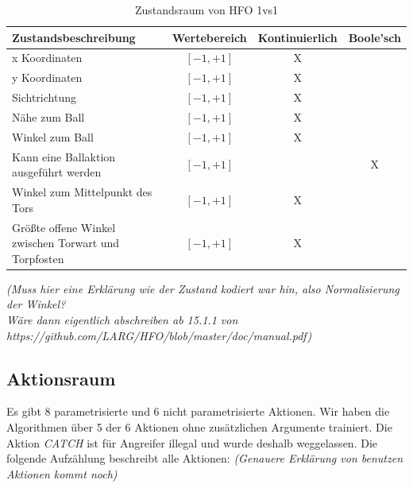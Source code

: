             \begin{table}[H]
                \begin{center}
                \hspace*{-1.5cm}
                \begin{tabular}{ |l|c|c|c| } 
                    \hline
                    \hfill Zustandsbeschreibung & Wertebereich & Kontinuierlich & Boole'sch \\ \hline
                    x Koordinaten & $[ -1, +1 ]$ & X & \hfill \\ \hline
                    y Koordinaten & $[ -1, +1 ]$ & X & \hfill \\ \hline
                    Sichtrichtung & $[ -1, +1]$ & X & \hfill \\ \hline
                    Nähe zum Ball & $[ -1, +1 ]$ & X & \hfill \\ \hline
                    Winkel zum Ball & $[ -1, +1 ]$ & X & \hfill \\ \hline
                    Kann eine Ballaktion ausgeführt werden & $[ -1, +1 ]$ & \hfill & X \\ \hline
                    Winkel zum Mittelpunkt des Tors & $[ -1, +1 ]$ & X & \hfill \\ \hline
                    Größte offene Winkel zwischen Torwart und Torpfosten & $[ -1, +1 ]$ & X & \hfill \\ \hline
                \end{tabular}
                \end{center}
                \caption{Zustandsraum von HFO 1vs1 \label{fig:somelabel}}
            \end{table}

            \hspace*{-1.5cm}
            \textit{(Muss hier eine Erklärung wie der Zustand kodiert war hin, also Normalisierung der Winkel?\\
            \hspace*{-1.5cm} Wäre dann eigentlich abschreiben ab 15.1.1 von https://github.com/LARG/HFO/blob/master/doc/manual.pdf)}
        \subsection{Aktionsraum}
            Es gibt 8 parametrisierte und 6 nicht parametrisierte Aktionen. Wir haben die Algorithmen über 5 der 6 Aktionen ohne zusätzlichen Argumente trainiert. Die Aktion \textit{CATCH} ist für Angreifer illegal und wurde deshalb weggelassen. Die folgende Aufzählung beschreibt alle Aktionen:
            \textit{(Genauere Erklärung von benutzen Aktionen kommt noch)}

